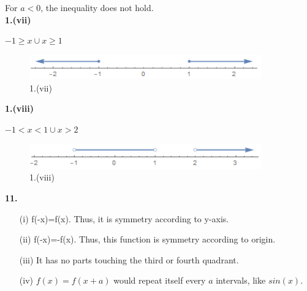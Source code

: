 \documentclass[a4paper,12pt]{report}
\begin{document}
\noindent
For $a < 0$, the inequality does not hold.\\ 

\noindent
\textbf{1.(vii)}

\noindent
$-1\geq x\cup x\geq 1$ 

\begin{figure}[h]
  \centering
  \includegraphics[width=10cm]{Pics/Chap41(vii).png}
  \caption{1.(vii)}
\end{figure}

\pagebreak
\noindent
\textbf{1.(viii)}

\noindent
$-1< x<1\cup x>2$ 

\begin{figure}[h]
  \centering
  \includegraphics[width=10cm]{Pics/Chap41(viii).png}
  \caption{1.(viii)}
\end{figure}

\noindent
\textbf{11.}

\begin{enumerate}
\item[(i)] f(-x)=f(x). Thus, it is symmetry according to y-axis.
\item[(ii)] f(-x)=-f(x). Thus, this function is symmetry according to origin.
\item[(iii)] It has no parts touching the third or fourth quadrant.
\item[(iv)] $f(x)=f(x+a)$ would repeat itself every $a$ intervals, like $sin(x)$.
\end{enumerate}
\end{document}
